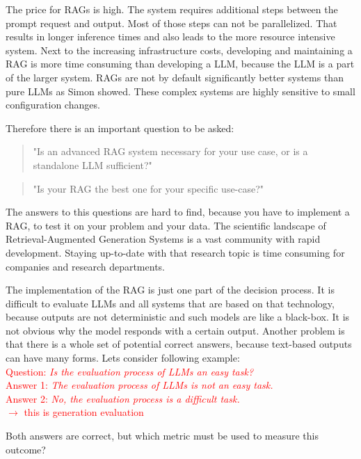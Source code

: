 The price for RAGs is high. The system requires additional steps between the prompt request and output. Most of those steps can not be parallelized. That results in longer inference times and also leads to the more resource intensive system. Next to the increasing infrastructure costs, developing and maintaining a RAG is more time consuming than developing a LLM, because the LLM is a part of the larger system. RAGs are not by default significantly better systems than pure LLMs as Simon \cite{Simon.10112024} showed. These complex systems are highly sensitive to small configuration changes.

Therefore there is an important question to be asked: 
\begin{quotation}
    "Is an advanced RAG system necessary for your use case, or is a standalone LLM sufficient?"
\end{quotation}
\begin{quotation}
    "Is your RAG the best one for your specific use-case?"
\end{quotation}

The answers to this questions are hard to find, because you have to implement a RAG, to test it on your problem and your data. The scientific landscape of Retrieval-Augmented Generation Systems is a vast community with rapid development. Staying up-to-date with that research topic is time consuming for companies and research departments. 

The implementation of the RAG is just one part of the decision process. It is difficult to evaluate LLMs and all systems that are based on that technology, because outputs are not deterministic and such models are like a black-box. It is not obvious why the model responds with a certain output. Another problem is that there is a whole set of potential correct answers, because text-based outputs can have many forms. Lets consider following example:\\

\textcolor{red}{Question: \textit{Is the evaluation process of LLMs an easy task?}\\
Answer 1: \textit{The evaluation process of LLMs is not an easy task.}\\
Answer 2: \textit{No, the evaluation process is a difficult task.}\\[6pt]$\longrightarrow$ this is generation evaluation\\}

Both answers are correct, but which metric must be used to measure this outcome? 

